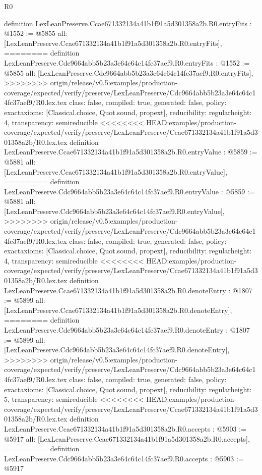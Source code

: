 \begin{lexlean}{R0}
\begin{coremodule}
{{{{{{{{{{{{{{{{{{{{{{{{{{{{{{{{{{{{{{{{{{{{{{{{{{{{{{{{{{{{{{{{{{{{{{{{{{{{{{{{{{{{{{{{{{{{{{{{{{definition LexLeanPreserve.Ccae671332134a41b1f91a5d301358a2b.R0.entryFits : @1552 := @5855 {
  all: [LexLeanPreserve.Ccae671332134a41b1f91a5d301358a2b.R0.entryFits],
========
definition LexLeanPreserve.Cdc9664abb5b23a3e64c64c14fc37aef9.R0.entryFits : @1552 := @5855 {
  all: [LexLeanPreserve.Cdc9664abb5b23a3e64c64c14fc37aef9.R0.entryFits],
>>>>>>>> origin/release/v0.5:examples/production-coverage/expected/verify/preserve/LexLeanPreserve/Cdc9664abb5b23a3e64c64c14fc37aef9/R0.lex.tex
  class: false,
  compiled: true,
  generated: false,
  policy: exact{axioms: [Classical.choice, Quot.sound, propext]},
  reducibility: regular{height: 4},
  transparency: semireducible
}
<<<<<<<< HEAD:examples/production-coverage/expected/verify/preserve/LexLeanPreserve/Ccae671332134a41b1f91a5d301358a2b/R0.lex.tex
definition LexLeanPreserve.Ccae671332134a41b1f91a5d301358a2b.R0.entryValue : @5859 := @5881 {
  all: [LexLeanPreserve.Ccae671332134a41b1f91a5d301358a2b.R0.entryValue],
========
definition LexLeanPreserve.Cdc9664abb5b23a3e64c64c14fc37aef9.R0.entryValue : @5859 := @5881 {
  all: [LexLeanPreserve.Cdc9664abb5b23a3e64c64c14fc37aef9.R0.entryValue],
>>>>>>>> origin/release/v0.5:examples/production-coverage/expected/verify/preserve/LexLeanPreserve/Cdc9664abb5b23a3e64c64c14fc37aef9/R0.lex.tex
  class: false,
  compiled: true,
  generated: false,
  policy: exact{axioms: [Classical.choice, Quot.sound, propext]},
  reducibility: regular{height: 4},
  transparency: semireducible
}
<<<<<<<< HEAD:examples/production-coverage/expected/verify/preserve/LexLeanPreserve/Ccae671332134a41b1f91a5d301358a2b/R0.lex.tex
definition LexLeanPreserve.Ccae671332134a41b1f91a5d301358a2b.R0.denoteEntry : @1807 := @5899 {
  all: [LexLeanPreserve.Ccae671332134a41b1f91a5d301358a2b.R0.denoteEntry],
========
definition LexLeanPreserve.Cdc9664abb5b23a3e64c64c14fc37aef9.R0.denoteEntry : @1807 := @5899 {
  all: [LexLeanPreserve.Cdc9664abb5b23a3e64c64c14fc37aef9.R0.denoteEntry],
>>>>>>>> origin/release/v0.5:examples/production-coverage/expected/verify/preserve/LexLeanPreserve/Cdc9664abb5b23a3e64c64c14fc37aef9/R0.lex.tex
  class: false,
  compiled: true,
  generated: false,
  policy: exact{axioms: [Classical.choice, Quot.sound, propext]},
  reducibility: regular{height: 5},
  transparency: semireducible
}
<<<<<<<< HEAD:examples/production-coverage/expected/verify/preserve/LexLeanPreserve/Ccae671332134a41b1f91a5d301358a2b/R0.lex.tex
definition LexLeanPreserve.Ccae671332134a41b1f91a5d301358a2b.R0.accepts : @5903 := @5917 {
  all: [LexLeanPreserve.Ccae671332134a41b1f91a5d301358a2b.R0.accepts],
========
definition LexLeanPreserve.Cdc9664abb5b23a3e64c64c14fc37aef9.R0.accepts : @5903 := @5917 {
}}}}}}}}}}}}}}}}}}}}}}}}}}}}}}}}}}}}}}}}}}}}}}}}}}}}}}}}}}}}}}}}}}}}}}}}}}}}}}}}}}}}}}}}}}}}}}}}}}}}}}}
\end{coremodule}
\end{lexlean}
